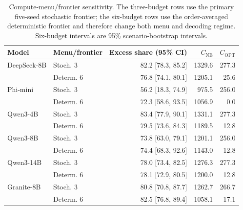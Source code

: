\begin{table}[H]
\centering
\caption{Compute-menu/frontier sensitivity. The three-budget rows use the primary five-seed stochastic frontier; the six-budget rows use the order-averaged deterministic frontier and therefore change both menu and decoding regime. Six-budget intervals are 95\% scenario-bootstrap intervals.}
\label{tab:menurobustness}
\small
\setlength{\tabcolsep}{3.0pt}
\begin{tabular}{llrrr}
\toprule
Model & Menu/frontier & Excess share (95\% CI) & $C_{\mathrm{NE}}$ & $C_{\mathrm{OPT}}$ \\
\midrule
DeepSeek-8B & Stoch. 3 & 82.2 [78.3, 85.2] & 1329.6 & 277.3 \\
             & Determ. 6 & 76.8 [74.1, 80.1] & 1205.1 & 25.6 \\
Phi-mini    & Stoch. 3 & 56.2 [18.3, 74.9] & 975.5 & 256.0 \\
             & Determ. 6 & 72.3 [58.6, 93.5] & 1056.9 & 0.0 \\
Qwen3-4B    & Stoch. 3 & 83.4 [77.9, 90.1] & 1331.1 & 277.3 \\
             & Determ. 6 & 79.5 [73.6, 84.3] & 1189.5 & 12.8 \\
Qwen3-8B    & Stoch. 3 & 73.8 [63.0, 79.1] & 1201.1 & 256.0 \\
             & Determ. 6 & 74.4 [68.3, 92.6] & 1143.0 & 12.8 \\
Qwen3-14B   & Stoch. 3 & 78.0 [73.4, 82.5] & 1276.3 & 277.3 \\
             & Determ. 6 & 78.1 [72.9, 80.5] & 1200.0 & 12.8 \\
Granite-8B  & Stoch. 3 & 80.8 [70.8, 87.7] & 1262.7 & 266.7 \\
             & Determ. 6 & 82.5 [76.8, 89.4] & 1058.1 & 17.1 \\
\bottomrule
\end{tabular}
\end{table}
